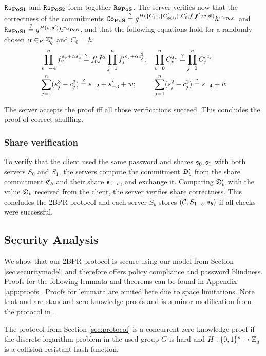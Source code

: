 \noindent
$\mathtt{Rs}_{\mathsf{\bf PoS}1}$ and $\mathtt{Rs}_{\mathsf{\bf PoS}2}$ form together $\mathtt{Rs}_{\mathsf{\bf PoS}}$.
The server verifies now that the correctness of the commitments
$\mathtt{Co}_\mathsf{\bf PoS} \stackrel{?}{=} g^{H(\{C_i\}, \{C'_{\phi(i)}\}, C'_0, \tilde{f}, \bm f', w, \tilde{w})} h^{r_{\mathtt{Co}_\mathsf{\bf PoS}}}$ and
$\mathtt{Rs}_{\mathsf{\bf PoS}1} \stackrel{?}{=} g^{H(\bm s, \bm s')} h^{r_{\mathtt{Rs}_\mathsf{\bf PoS}}}$,
and that the following equations hold for a randomly chosen $\alpha\in_R\mathbb{Z}^\ast_q$ and $C_0=h$:
\begin{align*}
  & \prod_{v=-4}^{n} f_v^{s_v+\alpha s'_v}  \stackrel{?}{=}  f'_0\tilde{f}^\alpha \prod_{j=1}^n {f'_j}^{c_j+\alpha c_j^2};
  &&  \prod_{v=0}^n C_v^{s_v}  \stackrel{?}{=}  \prod_{j=0}^n {C'_j}^{c_j} \\
  & \sum_{j=1}^n (s_j^3 - c_j^3)  \stackrel{?}{=}  s_{-2} + s'_{-3} + w;
  &&  \sum_{j=1}^n (s_j^2 - c_j^2)  \stackrel{?}{=}  s_{-4} + \tilde{w} 
\end{align*}

\noindent
The server accepts the proof iff all those verifications succeed.
This concludes the proof of correct shuffling.

\subsubsection{Share verification}
To verify that the client used the same password \pwd and shares $\mathfrak{s}_0,\mathfrak{s}_1$ with both servers $S_0$ and $S_1$, the servers compute the commitment $\mathfrak{D}'_b$ from the share commitment $\mathfrak{C}_b$ and their share $\mathfrak{s}_{1-b}$, and exchange it.
Comparing $\mathfrak{D}'_b$ with the value $\mathfrak{D}_b$ received from the client, the server verifies share correctness.
This concludes the 2BPR protocol and each server $S_b$ stores $(\mathcal{C},S_{1-b},\mathfrak{s}_b)$ if all checks were successful.

\subsection{Security Analysis}
We show that our 2BPR protocol is secure using our model from Section \ref{sec:securitymodel} and therefore offers policy compliance and password blindness.
Proofs for the following lemmata and theorems can be found in Appendix \ref{app:proofs}.
Proofs for lemmata are omited here due to space limitations.
Note that \PoM and \PoC are standard zero-knowledge proofs and \PoS is a minor modification from the protocol in \cite{FurukawaS01,Furukawa05}.

\begin{lemma}\label{lem:poc}
  The \PoC protocol from Section \ref{sec:protocol} is a concurrent zero-knowledge proof if the discrete logarithm problem in the used group $G$ is hard and $H:\{0,1\}^\ast\mapsto\mathbb{Z}_q$ is a collision resistant hash function.
\end{lemma}

